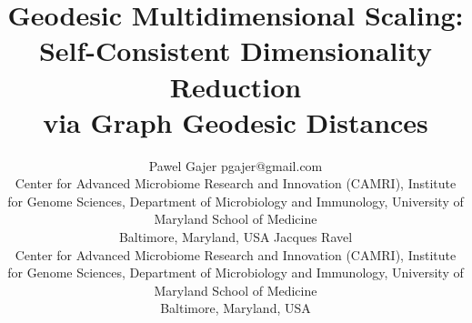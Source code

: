 \documentclass[twoside,11pt]{article}
\begin{document}
\title{Geodesic Multidimensional Scaling:\\
       Self-Consistent Dimensionality Reduction\\ via Graph Geodesic Distances}

\author{\name Pawel Gajer \email pgajer@gmail.com \\
        \addr Center for Advanced Microbiome Research and Innovation (CAMRI), Institute for Genome Sciences, Department of Microbiology and Immunology, University of Maryland School of Medicine \\
        Baltimore, Maryland, USA
        \AND
        \name Jacques Ravel \\
        \addr Center for Advanced Microbiome Research and Innovation (CAMRI), Institute for Genome Sciences, Department of Microbiology and Immunology, University of Maryland School of Medicine \\
        Baltimore, Maryland, USA}


\maketitle
\end{document}
